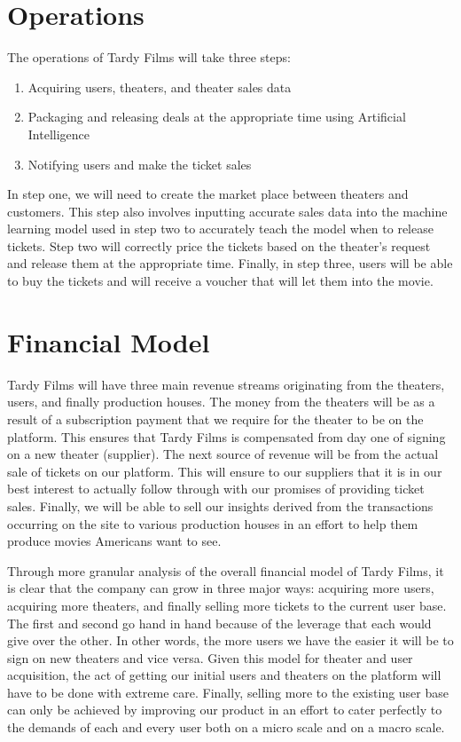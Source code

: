 \documentclass[12pt]{article}
\begin{document}
\section{Operations}
The operations of Tardy Films will take three steps: 
\begin{enumerate}
	\item Acquiring users, theaters, and theater sales data
	\item Packaging and releasing deals at the appropriate time using Artificial Intelligence
	\item Notifying users and make the ticket sales
\end{enumerate}
In step one, we will need to create the market place between theaters and customers. This step also involves inputting accurate sales data into the machine learning model used in step two to accurately teach the model when to release tickets. Step two will correctly price the tickets based on the theater's request and release them at the appropriate time. Finally, in step three, users will be able to buy the tickets and will receive a voucher that will let them into the movie.
\section{Financial Model}
Tardy Films will have three main revenue streams originating from the theaters, users, and finally production houses. The money from the theaters will be as a result of a subscription payment that we require for the theater to be on the platform. This ensures that Tardy Films is compensated from day one of signing on a new theater (supplier). The next source of revenue will be from the actual sale of tickets on our platform. This will ensure to our suppliers that it is in our best interest to actually follow through with our promises of providing ticket sales. Finally, we will be able to sell our insights derived from the transactions occurring on the site to various production houses in an effort to help them produce movies Americans want to see.

Through more granular analysis of the overall financial model of Tardy Films, it is clear that the company can grow in three major ways: acquiring more users, acquiring more theaters, and finally selling more tickets to the current user base. The first and second go hand in hand because of the leverage that each would give over the other. In other words, the more users we have the easier it will be to sign on new theaters and vice versa. Given this model for theater and user acquisition, the act of getting our initial users and theaters on the platform will have to be done with extreme care. Finally, selling more to the existing user base can only be achieved by improving our product in an effort to cater perfectly to the demands of each and every user both on a micro scale and on a macro scale.
\end{document}
